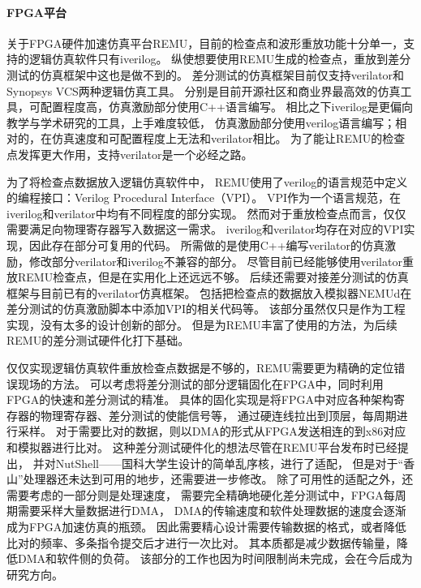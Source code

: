 \paragraph{FPGA平台}
关于FPGA硬件加速仿真平台REMU，目前的检查点和波形重放功能十分单一，支持的逻辑仿真软件只有iverilog。
纵使想要使用REMU生成的检查点，重放到差分测试的仿真框架中这也是做不到的。
差分测试的仿真框架目前仅支持verilator和Synopsys VCS两种逻辑仿真工具。
分别是目前开源社区和商业界最高效的仿真工具，可配置程度高，仿真激励部分使用C++语言编写。
相比之下iverilog是更偏向教学与学术研究的工具，上手难度较低，
仿真激励部分使用verilog语言编写；相对的，在仿真速度和可配置程度上无法和verilator相比。
为了能让REMU的检查点发挥更大作用，支持verilator是一个必经之路。

为了将检查点数据放入逻辑仿真软件中，
REMU使用了verilog的语言规范中定义的编程接口：Verilog Procedural Interface（VPI）。
VPI作为一个语言规范，在iverilog和verilator中均有不同程度的部分实现。
然而对于重放检查点而言，仅仅需要满足向物理寄存器写入数据这一需求。
iverilog和verilator均存在对应的VPI实现，因此存在部分可复用的代码。
所需做的是使用C++编写verilator的仿真激励，修改部分verilator和iverilog不兼容的部分。
尽管目前已经能够使用verilator重放REMU检查点，但是在实用化上还远远不够。
后续还需要对接差分测试的仿真框架与目前已有的verilator仿真框架。
包括把检查点的数据放入模拟器NEMUd在差分测试的仿真激励脚本中添加VPI的相关代码等。
该部分虽然仅只是作为工程实现，没有太多的设计创新的部分。
但是为REMU丰富了使用的方法，为后续REMU的差分测试硬件化打下基础。

仅仅实现逻辑仿真软件重放检查点数据是不够的，REMU需要更为精确的定位错误现场的方法。
可以考虑将差分测试的部分逻辑固化在FPGA中，同时利用FPGA的快速和差分测试的精准。
具体的固化实现是将FPGA中对应各种架构寄存器的物理寄存器、差分测试的使能信号等，
通过硬连线拉出到顶层，每周期进行采样。
对于需要比对的数据，则以DMA的形式从FPGA发送相连的到x86对应和模拟器进行比对。
这种差分测试硬件化的想法尽管在REMU平台发布时已经提出，
并对NutShell——国科大学生设计的简单乱序核，进行了适配，
但是对于“香山”处理器还未达到可用的地步，还需要进一步修改。
除了可用性的适配之外，还需要考虑的一部分则是处理速度，
需要完全精确地硬化差分测试中，FPGA每周期需要采样大量数据进行DMA，
DMA的传输速度和软件处理数据的速度会逐渐成为FPGA加速仿真的瓶颈。
因此需要精心设计需要传输数据的格式，或者降低比对的频率、多条指令提交后才进行一次比对。
其本质都是减少数据传输量，降低DMA和软件侧的负荷。
该部分的工作也因为时间限制尚未完成，会在今后成为研究方向。